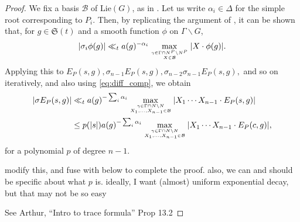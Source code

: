 \documentclass[11pt]{amsart}
\numberwithin{theorem}{section}
\numberwithin{equation}{section}
\theoremstyle{remark}
\theoremstyle{definition}
\begin{document}
{\begin{proof}
We fix a basis $\mathcal B$ of $\mathrm{Lie}(G)$, as in \cite[(A.7)]{GMP17}.
Let us write $\alpha_i \in \Delta$ for the simple root corresponding to $P_i$. Then, by replicating the argument of \cite[A.3.3]{GMP17}, it can be shown that, for $g \in \mathfrak S(t)$ and a smooth function $\phi$ on $\Gamma \backslash G$,
\begin{equation*}
|\sigma_i\phi(g)| \ll_t a(g)^{-\alpha_i}\max_{\gamma \in \Gamma \cap N^P \backslash N^P \atop X \in \mathcal B} |X \cdot \phi(g)|.
\end{equation*}
Applying this to $E_P(s,g), \sigma_{n-1}E_P(s,g), \sigma_{n-2}\sigma_{n-1}E_P(s,g),$ and so on iteratively, and also using \eqref{eq:diff_comp}, we obtain
\begin{align*}
|\sigma E_P(s,g)| &\ll_t a(g)^{-\sum_i \alpha_i}\max_{\gamma \in \Gamma \cap N \backslash N \atop X_1,\ldots,X_{n-1} \in \mathcal B} |X_1 \cdots X_{n-1} \cdot E_P(s,g)| \\
&\leq p(|s|)a(g)^{-\sum_i \alpha_i}\max_{\gamma \in \Gamma \cap N \backslash N \atop X_1,\ldots,X_{n-1} \in \mathcal B} |X_1 \cdots X_{n-1} \cdot E_P(c,g)|,
\end{align*}
for a polynomial $p$ of degree $n-1$.

{\color{red} modify this, and fuse with below to complete the proof. also, we can and should be specific about what $p$ is. ideally, I want (almost) uniform exponential decay, but that may not be so easy

See Arthur, ``Intro to trace formula'' Prop 13.2

}


\end{proof}}
\end{document}
